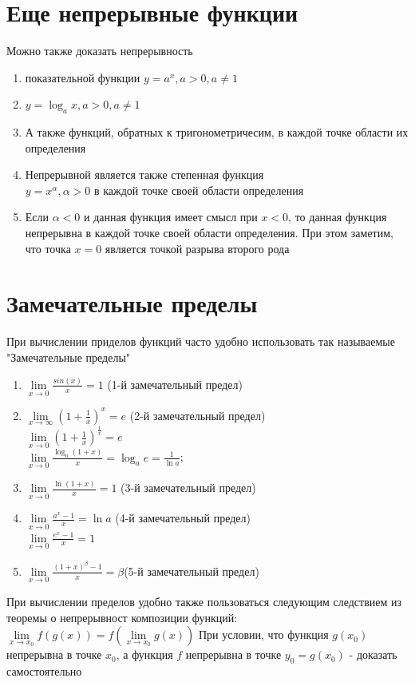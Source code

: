 \documentclass[oneside]{book}
\begin{document}
\begin{enumerate}
\section{Еще непрерывные функции}
Можно также доказать непрерывность
\begin{enumerate}
\item показательной функции $y=a^x, a>0, a \neq 1$
\item $y = \log_a x, a>0, a \neq 1$
\item А также функций, обратных к тригонометричесим, в каждой точке области их определения
\item Непрерывной является также степенная функция \\ $y=x^\alpha, \alpha > 0$ в каждой точке своей области определения
\item Если $\alpha < 0$ и данная функция имеет смысл при $x < 0$, то данная функция непрерывна в каждой точке своей области определения. При этом заметим, что точка $x=0$ является точкой разрыва второго рода
\end{enumerate}
\section{Замечательные пределы}
При вычислении приделов функций часто удобно использовать так называемые "Замечательные пределы"
\begin {enumerate}
\item $\lim\limits_{x\rightarrow 0}\frac{sin(x)}{x}=1$ (1-й замечательный предел)
\item $\lim\limits_{x\rightarrow \infty}(1+\frac{1}{x})^x=e$ (2-й замечательный предел)\\
$\lim\limits_{x\rightarrow 0}(1+\frac{1}{x})^{\frac{1}{x}}=e$
\\$\lim\limits_{x\rightarrow 0}\frac{\log_a(1+x)}{x}=\log_ae=\frac{1}{\ln a}$;
\item $\lim\limits_{x\rightarrow 0}\frac{\ln(1+x)}{x}=1$ (3-й замечательный предел)
\item $\lim\limits_{x\rightarrow 0}\frac{a^x-1}{x}=\ln a$ (4-й замечательный предел)\\
$\lim\limits_{x\rightarrow 0}\frac{e^x-1}{x}=1$
\item $\lim\limits_{x\rightarrow 0}\frac{(1+x)^\beta-1}{x}=\beta$(5-й замечательный предел)
\end{enumerate}
При вычислении пределов удобно также пользоваться следующим следствием из теоремы о непрерывност композиции функций:\\
$\lim \limits_{x\rightarrow x_0}f(g(x))=f(\lim \limits_{x\rightarrow x_0}g(x))$
При условии, что функция $g(x_0)$ непрерывна в точке $x_0$, а функция $f$ непрерывна в точке $y_0 = g(x_0)$ - доказать самостоятельно


\end{enumerate}
\end{document}
